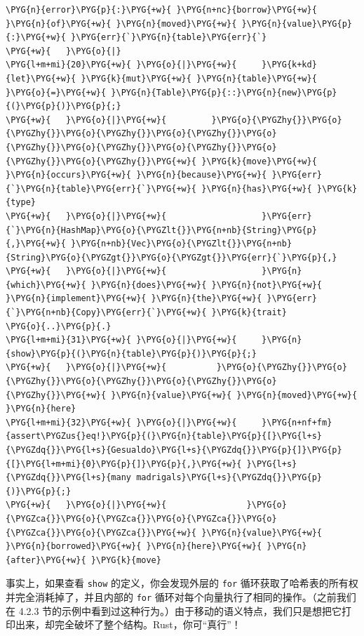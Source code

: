 \begin{Verbatim}[commandchars=\\\{\},breaklines=true,breakanywhere=true,fontsize=\codefont,xleftmargin=17bp]
\PYG{n}{error}\PYG{p}{:}\PYG{+w}{ }\PYG{n+nc}{borrow}\PYG{+w}{ }\PYG{n}{of}\PYG{+w}{ }\PYG{n}{moved}\PYG{+w}{ }\PYG{n}{value}\PYG{p}{:}\PYG{+w}{ }\PYG{err}{`}\PYG{n}{table}\PYG{err}{`}
\PYG{+w}{   }\PYG{o}{|}
\PYG{l+m+mi}{20}\PYG{+w}{ }\PYG{o}{|}\PYG{+w}{     }\PYG{k+kd}{let}\PYG{+w}{ }\PYG{k}{mut}\PYG{+w}{ }\PYG{n}{table}\PYG{+w}{ }\PYG{o}{=}\PYG{+w}{ }\PYG{n}{Table}\PYG{p}{::}\PYG{n}{new}\PYG{p}{(}\PYG{p}{)}\PYG{p}{;}
\PYG{+w}{   }\PYG{o}{|}\PYG{+w}{         }\PYG{o}{\PYGZhy{}}\PYG{o}{\PYGZhy{}}\PYG{o}{\PYGZhy{}}\PYG{o}{\PYGZhy{}}\PYG{o}{\PYGZhy{}}\PYG{o}{\PYGZhy{}}\PYG{o}{\PYGZhy{}}\PYG{o}{\PYGZhy{}}\PYG{o}{\PYGZhy{}}\PYG{+w}{ }\PYG{k}{move}\PYG{+w}{ }\PYG{n}{occurs}\PYG{+w}{ }\PYG{n}{because}\PYG{+w}{ }\PYG{err}{`}\PYG{n}{table}\PYG{err}{`}\PYG{+w}{ }\PYG{n}{has}\PYG{+w}{ }\PYG{k}{type}
\PYG{+w}{   }\PYG{o}{|}\PYG{+w}{                   }\PYG{err}{`}\PYG{n}{HashMap}\PYG{o}{\PYGZlt{}}\PYG{n+nb}{String}\PYG{p}{,}\PYG{+w}{ }\PYG{n+nb}{Vec}\PYG{o}{\PYGZlt{}}\PYG{n+nb}{String}\PYG{o}{\PYGZgt{}}\PYG{o}{\PYGZgt{}}\PYG{err}{`}\PYG{p}{,}
\PYG{+w}{   }\PYG{o}{|}\PYG{+w}{                   }\PYG{n}{which}\PYG{+w}{ }\PYG{n}{does}\PYG{+w}{ }\PYG{n}{not}\PYG{+w}{ }\PYG{n}{implement}\PYG{+w}{ }\PYG{n}{the}\PYG{+w}{ }\PYG{err}{`}\PYG{n+nb}{Copy}\PYG{err}{`}\PYG{+w}{ }\PYG{k}{trait}
\PYG{o}{..}\PYG{p}{.}
\PYG{l+m+mi}{31}\PYG{+w}{ }\PYG{o}{|}\PYG{+w}{     }\PYG{n}{show}\PYG{p}{(}\PYG{n}{table}\PYG{p}{)}\PYG{p}{;}
\PYG{+w}{   }\PYG{o}{|}\PYG{+w}{          }\PYG{o}{\PYGZhy{}}\PYG{o}{\PYGZhy{}}\PYG{o}{\PYGZhy{}}\PYG{o}{\PYGZhy{}}\PYG{o}{\PYGZhy{}}\PYG{+w}{ }\PYG{n}{value}\PYG{+w}{ }\PYG{n}{moved}\PYG{+w}{ }\PYG{n}{here}
\PYG{l+m+mi}{32}\PYG{+w}{ }\PYG{o}{|}\PYG{+w}{     }\PYG{n+nf+fm}{assert\PYGZus{}eq!}\PYG{p}{(}\PYG{n}{table}\PYG{p}{[}\PYG{l+s}{\PYGZdq{}}\PYG{l+s}{Gesualdo}\PYG{l+s}{\PYGZdq{}}\PYG{p}{]}\PYG{p}{[}\PYG{l+m+mi}{0}\PYG{p}{]}\PYG{p}{,}\PYG{+w}{ }\PYG{l+s}{\PYGZdq{}}\PYG{l+s}{many madrigals}\PYG{l+s}{\PYGZdq{}}\PYG{p}{)}\PYG{p}{;}
\PYG{+w}{   }\PYG{o}{|}\PYG{+w}{                }\PYG{o}{\PYGZca{}}\PYG{o}{\PYGZca{}}\PYG{o}{\PYGZca{}}\PYG{o}{\PYGZca{}}\PYG{o}{\PYGZca{}}\PYG{+w}{ }\PYG{n}{value}\PYG{+w}{ }\PYG{n}{borrowed}\PYG{+w}{ }\PYG{n}{here}\PYG{+w}{ }\PYG{n}{after}\PYG{+w}{ }\PYG{k}{move}
\end{Verbatim}

事实上，如果查看 \texttt{show} 的定义，你会发现外层的 \texttt{for} 循环获取了哈希表的所有权并完全消耗掉了，并且内部的 \texttt{for} 循环对每个向量执行了相同的操作。（之前我们在 4.2.3 节的示例中看到过这种行为。）由于移动的语义特点，我们只是想把它打印出来，却完全破坏了整个结构。Rust，你可“真行”！

